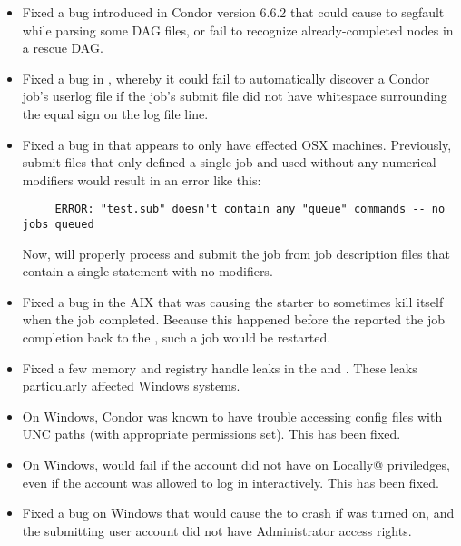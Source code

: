 \begin{itemize}

\item Fixed a bug introduced in Condor version 6.6.2 that could cause
       to segfault while parsing some DAG files, or
      fail to recognize already-completed nodes in a rescue DAG.

\item Fixed a bug in , whereby it could fail to
      automatically discover a Condor job's userlog file if the job's
      submit file did not have whitespace surrounding the equal sign
      on the log file line.

\item Fixed a bug in  that appears to only have
  effected OSX machines.
  Previously, submit files that only defined a single job and used
  \verb@queue@ without any numerical modifiers would result in an
  error like this: 
\footnotesize
\begin{verbatim}
     ERROR: "test.sub" doesn't contain any "queue" commands -- no jobs queued
\end{verbatim}
\normalsize
  Now,  will properly process and submit the job from
  job description files that contain a single \verb@queue@ statement
  with no modifiers.

\item Fixed a bug in the AIX  that was causing the
starter to sometimes kill itself when the job completed.  Because this
happened before the  reported the job completion back
to the , such a job would be restarted.

\item Fixed a few memory and registry handle leaks in the 
and . These leaks particularly affected Windows systems.

\item On Windows, Condor was known to have trouble accessing config files
with UNC paths (with appropriate permissions set). This has been fixed.

\item On Windows,  would fail if the account did not
have \verb@Log on Locally@ priviledges, even if the account was allowed
to log in interactively. This has been fixed.

\item Fixed a bug on Windows that would cause the  to
crash if  was turned on, and the submitting user
account did not have Administrator access rights.

\end{itemize}

